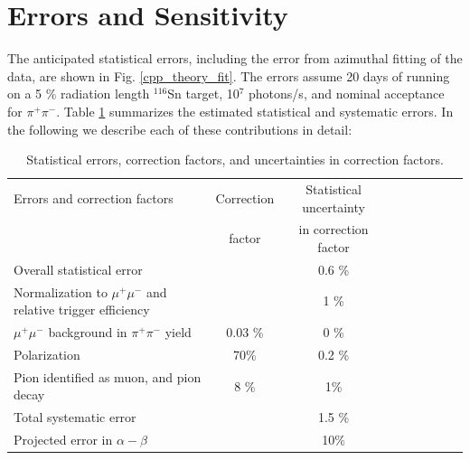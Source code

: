 \section{Errors and Sensitivity}


The anticipated statistical errors, including the error from azimuthal fitting of the data, are shown in Fig. \ref{cpp_theory_fit}.
The errors assume 20 days of running on a 5 \% radiation length $^{116}$Sn target, 10$^7$ photons/s, and nominal acceptance for $\pi^+ \pi^-$.
Table \ref{errors} summarizes the estimated statistical and systematic errors. In the following we describe each of
these contributions in detail: 

\begin{table}[bt]
\caption{Statistical errors, correction factors, and uncertainties in correction factors.
\label{errors}
}
\begin{center}
\begin{tabular}{|l|c|c|c|c|c|c|c|c|}
\hline
\hline
    Errors and correction factors  &  Correction       & Statistical uncertainty    \\ 
                                                         &     factor            & in correction factor    \\  \hline \hline
  Overall statistical error  &      &  0.6 \%    \\ \hline
  Normalization to $\mu^+ \mu^-$  and relative trigger efficiency &     &  1 \%     \\ \hline
  $\mu^+ \mu^-$ background in $\pi^+ \pi^-$ yield  & 0.03 \% &  0 \%   \\ \hline
  Polarization  &   70\%   &  0.2 \%     \\ \hline
  Pion identified as muon, and pion decay &  8 \%   &   1\%   \\ \hline
  Total systematic error &   & 1.5 \% \\ \hline
  Projected error in $\alpha - \beta$ &   &  10\%  \\ \hline
 \hline
 \hline
\end{tabular}
\end{center}
\end{table}

